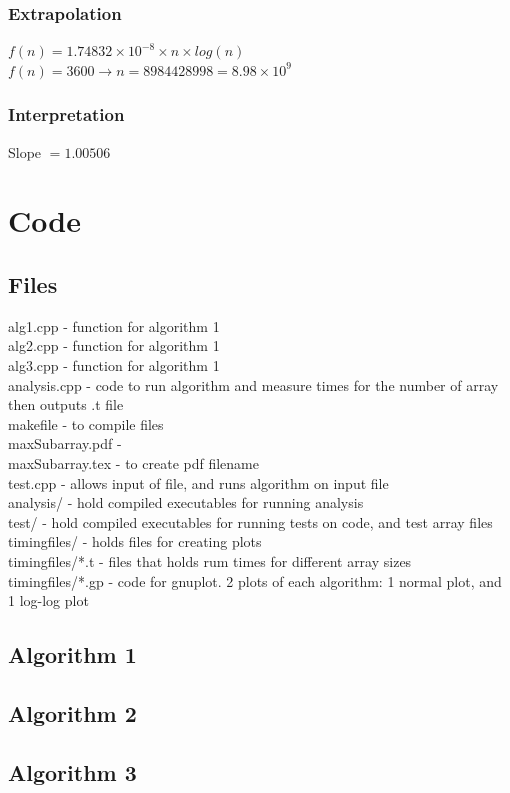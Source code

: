 \documentclass[a4paper,10pt]{article}
\begin{document}
			\subsubsection{Extrapolation}
				$f(n) = 1.74832 \times 10^{-8} \times n \times log(n)$\\
				$f(n) = 3600 \to n = 8984428998 =8.98 \times 10^9$
			\subsubsection{Interpretation}
				Slope $= 1.00506$

	\newpage
	\section{Code}
		\subsection{Files}
			alg1.cpp - function for algorithm 1\\
			alg2.cpp - function for algorithm 1\\
			alg3.cpp - function for algorithm 1\\
			analysis.cpp - code to run algorithm and measure times for the number of array then outputs .t file\\
			makefile - to compile files\\
			maxSubarray.pdf - \\
			maxSubarray.tex - to create pdf filename\\
			test.cpp - allows input of file, and runs algorithm on input file\\
			analysis/ - hold compiled executables for running analysis\\
			test/ - hold compiled executables for running tests on code, and test array files\\
			timingfiles/ - holds files for creating plots\\
			timingfiles/*.t - files that holds rum times for different array sizes\\
			timingfiles/*.gp - code for gnuplot. 2 plots of each algorithm: 1 normal plot, and 1 log-log plot
		\subsection{Algorithm 1}
		
		\newpage
		\subsection{Algorithm 2}
		
		\newpage
		\subsection{Algorithm 3}
		
		
\end{document}
